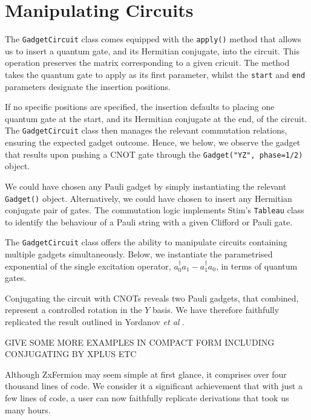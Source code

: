 \section{Manipulating Circuits}

The \lstinline{GadgetCircuit} class comes equipped with the \lstinline{apply()} method that allows us to insert a quantum gate, and its Hermitian conjugate, into the circuit. This operation preserves the matrix corresponding to a given cricuit. The method takes the quantum gate to apply as its first parameter, whilst the \lstinline{start} and \lstinline{end} parameters designate the insertion positions.


If no specific positions are specified, the insertion defaults to placing one quantum gate at the start, and its Hermitian conjugate at the end, of the circuit. The \lstinline{GadgetCircuit} class then manages the relevant commutation relations, ensuring the expected gadget outcome. Hence, we below, we observe the gadget that results upon pushing a CNOT gate through the \lstinline{Gadget("YZ", phase=1/2)} object.


We could have chosen any Pauli gadget by simply instantiating the relevant \lstinline{Gadget()} object. Alternatively, we could have chosen to insert any Hermitian conjugate pair of gates. The commutation logic implements Stim's \lstinline{Tableau} class to identify the behaviour of a Pauli string with a given Clifford or Pauli gate.


The \lstinline{GadgetCircuit} class offers the ability to manipulate circuits containing multiple gadgets simultaneously. Below, we instantiate the parametrised exponential of the single excitation operator, $a^\dagger_0 a_1 - a^\dagger_1 a_0$, in terms of quantum gates.


Conjugating the circuit with CNOTs reveals two Pauli gadgets, that combined, represent a controlled rotation in the $Y$ basis. We have therefore faithfully replicated the result outlined in Yordanov \textit{et al} \cite{Yordanov2020}.


GIVE SOME MORE EXAMPLES IN COMPACT FORM INCLUDING CONJUGATING BY XPLUS ETC

Although ZxFermion may seem simple at first glance, it comprises over four thousand lines of code. We consider it a significant achievement that with just a few lines of code, a user can now faithfully replicate derivations that took us many hours.
